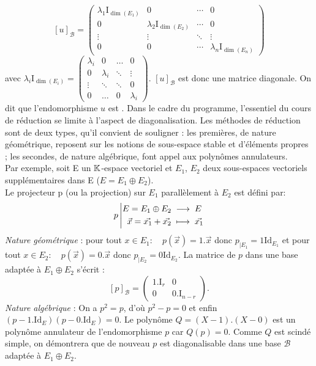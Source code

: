 \documentclass[a4paper]{book}
\begin{document}
$$ [u]_\mathcal{B} = \begin{pmatrix}\lambda_1 \mathrm {I}_{\dim(E_1)}&\mathrm {0}&\cdots &\mathrm {0}\\\mathrm {0}&\lambda_2 \mathrm {I}_{\dim(E_2)}&\cdots &\mathrm {0}\\\vdots &\vdots &\ddots &\vdots \\\mathrm {0}&\mathrm {0}&\cdots &\lambda_n \mathrm {I}_{\dim(E_n)}\end{pmatrix}$$
avec $\lambda_i \mathrm {I}_{\dim(E_i)}= \begin{pmatrix}\lambda_i&0&\ldots &0\\0&\lambda_i&\ddots &\vdots \\\vdots &\ddots &\ddots &0\\0&\ldots &0&\lambda_i\end{pmatrix}$. $ [u]_\mathcal{B} $ est donc une matrice diagonale. On dit que l'endomorphisme $u$ est . Dans le cadre du programme, l'essentiel du cours de réduction se limite à l'aspect de diagonalisation. Les méthodes de réduction sont de deux types, qu'il convient de souligner : les premières, de nature géométrique, reposent sur les notions de sous-espace stable et d'éléments propres ; les secondes, de nature algébrique, font appel aux polynômes annulateurs.\\


Par exemple, soit E un $\mathbb{K} $-espace vectoriel et $E_1$, $E_2$ deux sous-espaces vectoriels supplémentaires dans E  ($E = E_1 \oplus E_2$).\\
Le projecteur p (ou la projection) sur $E_1$ parallèlement à $E_2$ est défini par:
$${p}\left|\begin{aligned}{ E = E_1 \oplus E_2 }&\;\longrightarrow\;{ E}\\{\vec{x} = \vec{x_1} + \vec{x_2}}&\;\longmapsto\;{\vec{x_1}}\end{aligned}\right.$$
\textit{Nature géométrique} : pour tout $x\in E_1:\quad p(\vec{x})= 1.\vec{x}$ donc  $p_{|E_1}=1 \mathrm{Id}_{E_1}$ et  pour tout $x\in E_2:\quad p(\vec{x})= 0.\vec{x}$ donc  $p_{|E_2}=0 \mathrm{Id}_{E_2}$. La matrice de $p$ dans une base adaptée à $E_1 \oplus E_2$ s'écrit :
$$[p]_\mathcal{B} =\begin{pmatrix}1.\mathrm{I}_r&0\\ 0 &0.\mathrm{I}_{n-r}\end{pmatrix}.$$
\textit{Nature algébrique} : On a $p^2=p$, d'où $p^2-p=0$ et enfin $(p-1.\mathrm{Id}_E)(p-0.\mathrm{Id}_E)=0$. Le polynôme $Q=(X-1).(X-0)$ est un polynôme annulateur de l'endomorphisme $p$ car $Q(p)=0$. Comme $Q$ est scindé simple, on démontrera que de nouveau $p$ est diagonalisable dans une base $\mathcal{B} $ adaptée à $E_1 \oplus E_2$.  
\end{document}
